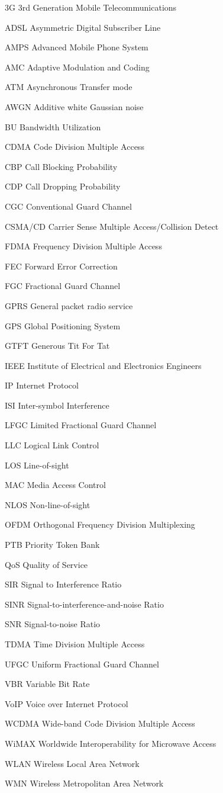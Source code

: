 \begin{denotation}
\item[3G] 3rd Generation Mobile Telecommunications
\item[ADSL] Asymmetric Digital Subscriber Line
\item[AMPS] Advanced Mobile Phone System
\item[AMC] Adaptive Modulation and Coding
\item[ATM]Asynchronous Transfer mode
\item[AWGN]  Additive white Gaussian noise
\item[BU] Bandwidth Utilization
\item[CDMA] Code Division Multiple Access 
\item[CBP] Call Blocking Probability
\item[CDP] Call Dropping Probability
\item[CGC] Conventional Guard Channel
\item[CSMA/CD] Carrier Sense Multiple Access/Collision Detect
\item[FDMA]Frequency Division Multiple Access
\item[FEC] Forward Error Correction
\item[FGC] Fractional Guard Channel
  \item[GPRS] General packet radio service
  \item[GPS] Global Positioning System
  \item[GTFT] Generous Tit For Tat
  \item[IEEE] Institute of Electrical and Electronics Engineers
  \item[IP] Internet Protocol
  \item[ISI] Inter-symbol Interference
  \item[LFGC] Limited Fractional Guard Channel
  \item[LLC] Logical Link Control
  \item[LOS] Line-of-sight
  \item[MAC] Media Access Control
  \item[NLOS] Non-line-of-sight
  \item[OFDM] Orthogonal Frequency Division Multiplexing 
  \item[PTB] Priority Token Bank
  \item[QoS] Quality of Service
  \item[SIR] Signal to Interference Ratio
  \item[SINR]Signal-to-interference-and-noise Ratio
  \item[SNR] Signal-to-noise Ratio
  \item[TDMA]Time Division Multiple Access
  \item[UFGC] Uniform Fractional Guard Channel
  \item[VBR] Variable Bit Rate
  \item[VoIP] Voice over Internet Protocol 
  \item[WCDMA] Wide-band Code Division Multiple Access
  \item[WiMAX] Worldwide Interoperability for Microwave Access
  \item[WLAN] Wireless Local Area Network
  \item[WMN] Wireless Metropolitan Area Network
\end{denotation}

